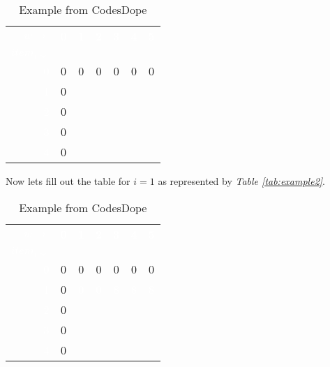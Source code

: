 \begin{table}[h!]
	\begin{center}
		\caption{Example from CodesDope \cite{noauthor_knapsack_nodate-2}}
		\label{tab:example2-step1}
		\begin{tabular}{R|c|c|c|c|c|c}
			\toprule %
			\textcolor{white}{\textbf{$w \rightarrow$}} & \textcolor{white}{\textbf{0}} & \textcolor{white}{\textbf{1}} & \textcolor{white}{\textbf{2}} & \textcolor{white}{\textbf{3}} & \textcolor{white}{\textbf{4}} & \textcolor{white}{\textbf{5}}\\
			\textcolor{white}{$item_i \downarrow$} & & & & & & \\
			\midrule %
			\textcolor{white}{0} & 0 & 0 & 0 & 0 & 0 &  0 \\
			\hline
			\textcolor{white}{1} & 0 & & & & & \\
			\hline
			\textcolor{white}{2} & 0 & & & & & \\
			\hline
			\textcolor{white}{3} & 0 & & & & & \\
			\hline
			\textcolor{white}{4} & 0 & & & & & 
		\end{tabular}
	\end{center} \vspace{12pt}
\end{table}

Now lets fill out the table for $i = 1$ as represented by \textit{Table \ref{tab:example2}}.
\newpage
\begin{table}[h!]
	\begin{center}
		\caption{Example from CodesDope \cite{noauthor_knapsack_nodate-2}}
		\label{tab:example2-step2}
		\begin{tabular}{R|c|c|c|c|c|c}
			\toprule %
			\textcolor{white}{\textbf{$w \rightarrow$}} & \textcolor{white}{\textbf{0}} & \textcolor{white}{\textbf{1}} & \textcolor{white}{\textbf{2}} & \textcolor{white}{\textbf{3}} & \textcolor{white}{\textbf{4}} & \textcolor{white}{\textbf{5}}\\
			\textcolor{white}{$item_i \downarrow$} & & & & & & \\
			\midrule %
			\textcolor{white}{0} & 0 & 0 & 0 & 0 & 0 &  0 \\
			\hline
			\textcolor{white}{1} &  0 & \textcolor{white}{0} & \textcolor{white}{0} & \textcolor{white}{8} & \textcolor{white}{8} & \textcolor{white}{8} \\
			\hline
			\textcolor{white}{2} & 0 & & & & \\
			\hline
			\textcolor{white}{3} & 0 & & & & & \\
			\hline
			\textcolor{white}{4} & 0 & & & & &
		\end{tabular}
	\end{center} \vspace{12pt}
\end{table}

